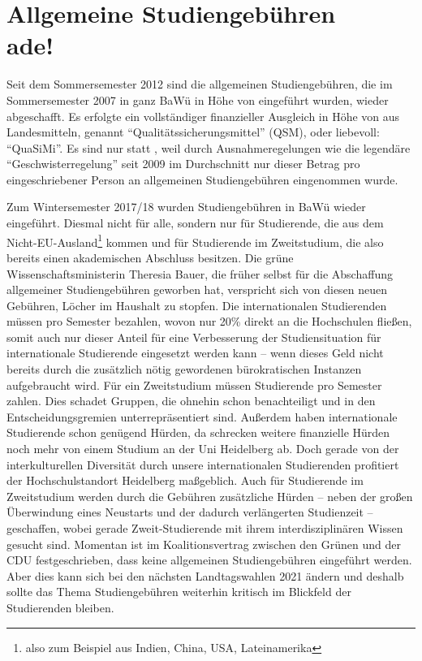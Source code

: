 \section[Allgemeine Studiengebühren ade]{Allgemeine Studiengebühren \\ade!}


Seit dem Sommersemester 2012 sind die allgemeinen Studiengebühren, die im Sommersemester 2007 in ganz BaWü in Höhe von  eingeführt wurden, wieder abgeschafft. Es erfolgte ein vollständiger finanzieller Ausgleich in Höhe von  aus Landesmitteln, genannt “Qualitätssicherungsmittel” (QSM), oder liebevoll: “QuaSiMi”. Es sind nur  statt , weil durch Ausnahmeregelungen wie die legendäre “Geschwisterregelung” seit 2009 im Durchschnitt nur dieser Betrag pro eingeschriebener Person an allgemeinen Studiengebühren eingenommen wurde.

Zum Wintersemester 2017/18 wurden Studiengebühren in BaWü wieder eingeführt. Diesmal nicht für alle, sondern nur für Studierende, die aus dem Nicht-EU-Ausland\footnote{also zum Beispiel aus Indien, China, USA, Lateinamerika} kommen und für Studierende im Zweitstudium, die also bereits einen akademischen Abschluss besitzen. Die grüne Wissenschaftsministerin Theresia Bauer, die früher selbst für die Abschaffung allgemeiner Studiengebühren geworben hat, verspricht sich von diesen neuen Gebühren, Löcher im Haushalt zu stopfen. Die internationalen Studierenden müssen  pro Semester bezahlen, wovon nur 20\% direkt an die Hochschulen fließen, somit auch nur dieser Anteil für eine Verbesserung der Studiensituation für internationale Studierende eingesetzt werden kann -- wenn dieses Geld nicht bereits durch die zusätzlich nötig gewordenen bürokratischen Instanzen aufgebraucht wird. Für ein Zweitstudium müssen Studierende  pro Semester zahlen. Dies schadet Gruppen, die ohnehin schon benachteiligt und in den Entscheidungsgremien unterrepräsentiert sind. Außerdem haben internationale Studierende schon genügend Hürden, da schrecken weitere finanzielle Hürden noch mehr von einem Studium an der Uni Heidelberg ab. Doch gerade von der interkulturellen Diversität durch unsere internationalen Studierenden profitiert der Hochschulstandort Heidelberg maßgeblich. Auch für Studierende im Zweitstudium werden durch die Gebühren zusätzliche Hürden -- neben der großen Überwindung eines Neustarts und der dadurch verlängerten Studienzeit -- geschaffen, wobei gerade Zweit-Studierende mit ihrem interdisziplinären Wissen gesucht sind. Momentan ist im Koalitionsvertrag zwischen den Grünen und der CDU festgeschrieben, dass keine allgemeinen Studiengebühren eingeführt werden. Aber dies kann sich bei den nächsten Landtagswahlen 2021 ändern und deshalb sollte das Thema Studiengebühren weiterhin kritisch im Blickfeld der Studierenden bleiben.


